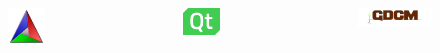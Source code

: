 \documentclass[aspectratio=169]{beamer}
\begin{document}
\begin{frame}[t]
\begin{columns}[c]
        \begin{figure}
            \includegraphics[width=0.5\textwidth]{img/logo-cmake.png}
        \end{figure}

        \begin{figure}
            \includegraphics[width=0.5\textwidth]{img/logo-qt.png}
        \end{figure}

        \begin{figure}
            \includegraphics[width=1\textwidth]{img/logo-gdcm.png}
        \end{figure}

    \end{columns}
\end{frame}
\end{document}
